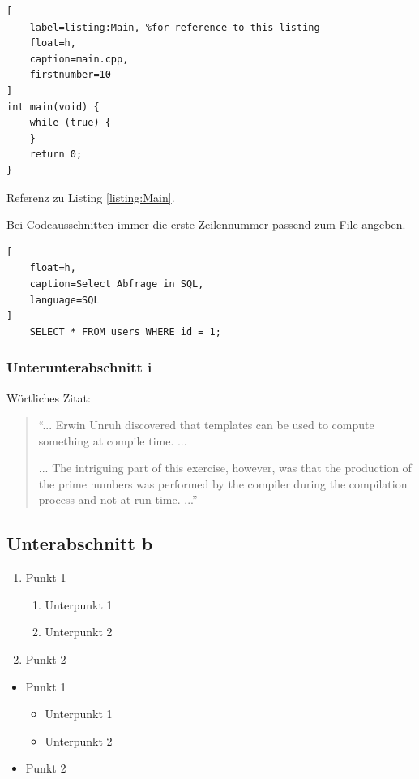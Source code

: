 \begin{lstlisting}[
	label=listing:Main, %for reference to this listing
	float=h,
	caption=main.cpp,
	firstnumber=10
]
int main(void) {
	while (true) {
	}
	return 0;
}
\end{lstlisting}

Referenz zu Listing \ref{listing:Main}.

Bei Codeausschnitten immer die erste Zeilennummer passend zum File angeben.

\begin{lstlisting}[
	float=h,
	caption=Select Abfrage in SQL,
	language=SQL
]
	SELECT * FROM users WHERE id = 1;
\end{lstlisting}

\subsubsection{Unterunterabschnitt i}

Wörtliches Zitat:
\begin{quote}
``... Erwin Unruh discovered that templates can be used to compute
something at compile time. ...

... The intriguing part of this exercise, however, was that the
production of the prime numbers was performed by the compiler during
the compilation process and not at run time. ...''

\cite[S.305]{Vandevoorde:2002}
\end{quote}


\subsection{Unterabschnitt b}

\begin{enumerate}
	\item Punkt 1
	\begin{enumerate}
		\item Unterpunkt 1
		\item Unterpunkt 2
	\end{enumerate}
	\item Punkt 2
\end{enumerate}

\begin{itemize}
	\item Punkt 1
	\begin{itemize}
		\item Unterpunkt 1
		\item Unterpunkt 2
	\end{itemize}
	\item Punkt 2
\end{itemize}


